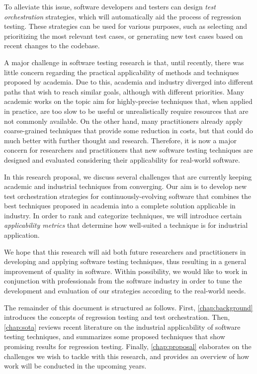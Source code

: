 To alleviate this issue, software developers and testers can design \textit{test orchestration} strategies, which will automatically aid the process of regression testing.
These strategies can be used for various purposes, such as selecting and prioritizing the most relevant test cases, or generating new test cases based on recent changes to the codebase.

A major challenge in software testing research is that, until recently, there was little concern regarding the practical applicability of methods and techniques proposed by academia.
Due to this, academia and industry diverged into different paths that wish to reach similar goals, although with different priorities.
Many academic works on the topic aim for highly-precise techniques that, when applied in practice, are too slow to be useful or unrealistically require resources that are not commonly available.
On the other hand, many practitioners already apply coarse-grained techniques that provide some reduction in costs, but that could do much better with further thought and research. 
Therefore, it is now a major concern for researchers and practitioners that new software testing techniques are designed and evaluated considering their applicability for real-world software.

In this research proposal, we discuss several challenges that are currently keeping academic and industrial techniques from converging.
Our aim is to develop new test orchestration strategies for continuously-evolving software that combines the best techniques proposed in academia into a complete solution applicable in industry.
In order to rank and categorize techniques, we will introduce certain \textit{applicability metrics} that determine how well-suited a technique is for industrial application.

We hope that this research will aid both future researchers and practitioners in developing and applying software testing techniques, thus resulting in a general improvement of quality in software.
Within possibility, we would like to work in conjunction with professionals from the software industry in order to tune the development and evaluation of our strategies according to the real-world needs.

The remainder of this document is structured as follows.
First, \autoref{chap:background} introduces the concepts of regression testing and test orchestration.
Then, \autoref{chap:sota} reviews recent literature on the industrial applicability of software testing techniques, and summarizes some proposed techniques that show promising results for regression testing.
Finally, \autoref{chap:proposal} elaborates on the challenges we wish to tackle with this research, and provides an overview of how work will be conducted in the upcoming years.